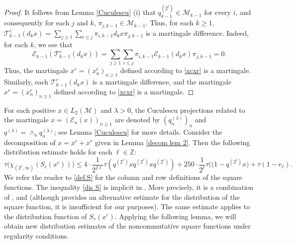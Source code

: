 \documentclass[11]{amsart}
\numberwithin{equation}{section}
\newcommand{\M}{\mathcal{M}}
\begin{document}
\begin{proof}
	It follows from Lemma \ref{Cuculescu} (i) that $q_{k-1}^{(2^i)}\in \mathcal{M}_{k-1}$ for every $i$, and consequently for each $j$ and $k$, $\pi_{j,k-1}\in \M_{k-1}$. Thus, for each $k\geq1$, 
	$\mathcal{T}^c_{k-1}(d_k x)=\sum_{j\geq 1}\sum_{i\leq j}\pi_{i,k-1}d_kx\pi_{j,k-1}$ is a martingale difference.		
	Indeed, for each $k$, we see that 
	$$\mathcal{E}_{k-1}(\mathcal{T}^c_{k-1}(d_k x))= \sum_{j\geq 1}\sum_{i\leq j}\pi_{i,k-1}\mathcal{E}_{k-1}(d_kx)\pi_{j,k-1}=0. $$
	Thus, the martingale  $x^c=(x_n^c)_{n\geq1}$ defined according to \eqref{xcxr} is a martingale. 
	Similarly, each $\mathcal{T}_{k-1}^r(d_k x)$ is a martingale difference, and the martingale  $x^r=(x_n^r)_{n\geq1}$ defined according to \eqref{xcxr} is a martingale. 
\end{proof}



For each positive $x\in L_2(\mathcal{M})$ and $\lambda>0$, the Cuculescu projections related to the martingale $x=(\mathcal{E}_n(x))_{n\geq1}$ are  denoted by $(q_n^{(\lambda)})_n$ and $q^{(\lambda)}=\wedge_nq_n^{(\lambda)}$; see Lemma \ref{Cuculescu} for more details. Consider the decomposition of $x=x^c+x^r$ given in Lemma \ref{decom lem 2}. Then the following distribution estimate holds for each $\ell\in\mathbb{Z}$:
\begin{equation}\label{dis S}
	\tau\Big(\chi_{(2^{\ell},\infty)}(S_c(x^c))\Big)\leq  4\cdot\frac{1}{2^{2\ell}} \tau(q^{(2^\ell)}xq^{(2^\ell)}xq^{(2^\ell)})+250\cdot \frac{1}{2^{\ell}} \tau\Big((1-q^{(2^\ell)}x\Big)+\tau(1-e_{\ell}).
\end{equation}
We refer the reader to \eqref{def:S} for the column and row definitions of the square functions. The inequality \eqref{dis S} is implicit in \cite{JRWZ2020}. More precisely, it is a combination of \cite[(4.13)]{JRWZ2020}, \cite[(3.2)]{JRWZ2020}  and \cite[(3.3)]{JRWZ2020} (although  \cite[Remark 4.7 ]{JRWZ2020} provides an alternative estimate for the distribution of the square function, it is insufficient for our purposes).   The same  estimate applies to the distribution function of $S_r(x^r)$.  Applying the following lemma, we will obtain  new distribution estimates of the noncommutative square functions under regularity conditions.
\end{document}
